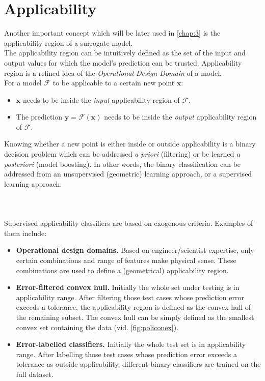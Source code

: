 \section{Applicability}
Another important concept which will be later used in \autoref{chap:3} is the applicability region of a surrogate model.\\
\indent The applicability region can be intuitively defined as the set of the input and output values for which the model's prediction can be trusted. Applicability region is a refined idea of the \textit{Operational Design Domain} of a model.\\
\indent For a model $\mathcal{F}$ to be applicable to a certain new point $\mathbf{x}$:
\begin{itemize}
	\item $\mathbf{x}$ needs to be inside the \textit{input} applicability region of $\mathcal{F}$.
	\item The prediction $\mathbf{y}=\mathcal{F}(\mathbf{x})$ needs to be inside the \textit{output} applicability region of $\mathcal{F}$.\\
\end{itemize}
%
\indent Knowing whether a new point is either inside or outside applicability is a binary decision problem which can be addressed \textit{a priori} (filtering) or be learned \textit{a posteriori} (model boosting). In other words, the binary classification can be addressed from an unsupervised (geometric) learning approach, or a supervised learning approach:
\paragraph{ \\}
Supervised applicability classifiers are based on exogenous criteria. Examples of them include:
\begin{itemize}
	\item \textbf{Operational design domains.} Based on engineer/scientist expertise, only certain combinations and range of features make physical sense. These combinations are used to define a (geometrical) applicability region.
	\item \textbf{Error-filtered convex hull.} Initially the whole set under testing is in applicability range. After filtering those test cases whose prediction error exceeds a tolerance, the applicability region is defined as the convex hull of the remaining subset. The convex hull can be simply defined as the smallest convex set containing the data\cite{Preparata1985} (vid. \autoref{fig:policonex}).
	\item \textbf{Error-labelled classifiers.} Initially the whole test set is in applicability range. After labelling those test cases whose prediction error exceeds a tolerance as outside applicability, different binary classifiers are trained on the full dataset.\\
\end{itemize}

